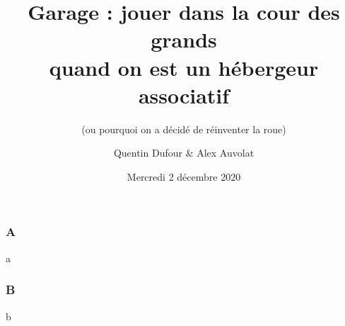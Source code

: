 \documentclass[aspectratio=169]{beamer}
\title[Garage : jouer dans la cour des grands quand on est un hébergeur associatif]{Garage : jouer dans la cour des grands \\quand on est un hébergeur associatif}
\subtitle{(ou pourquoi on a décidé de réinventer la roue)}
\author[Q. Dufour \& A. Auvolat]{Quentin Dufour \& Alex Auvolat}
\date[02/12/2020]{Mercredi 2 décembre 2020}
\begin{document}
\begin{frame}
\titlepage
\end{frame}

\begin{frame}
	\frametitle{A}

	a
\end{frame}

\begin{frame}
	\frametitle{B}

	b
\end{frame}
\end{document}
